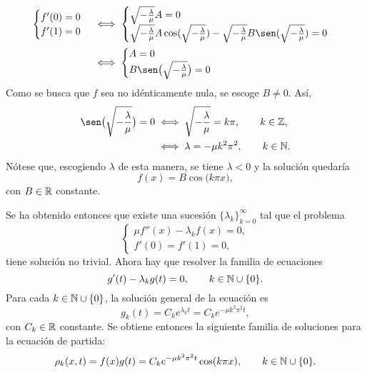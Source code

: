 \documentclass[11pt]{report}
\begin{document}
\begin{solution}
\begin{enumerate}
\begin{itemize}
            \begin{align*}
                \begin{cases}
                    f'(0)=0\\
                    f'(1)=0
                \end{cases} &\iff \begin{cases}
                    \sqrt{-\frac{\lambda}{\mu}}A = 0 \\
                    \sqrt{-\frac{\lambda}{\mu}} A \cos(\sqrt{-\frac{\lambda}{\mu}})-\sqrt{-\frac{\lambda}{\mu}}B\sen(\sqrt{-\frac{\lambda}{\mu}}) = 0
                \end{cases}
                \\
                &\iff \begin{cases}
                    A = 0 \\
                    B\sen\bigl(\sqrt{-\frac{\lambda}{\mu}}\bigr) = 0
                \end{cases}
            \end{align*}
            Como se busca que $f$ sea no idénticamente nula, se escoge $B \neq 0$. Así,
            \begin{align*}
                \sen\bigl(\sqrt{-\frac{\lambda}{\mu}}\bigr) = 0 &\iff \sqrt{-\frac{\lambda}{\mu}} = k\pi, \qquad k \in \Z, \\
                &\iff \lambda = -\mu k^2\pi^2, \qquad k \in \N.
            \end{align*}
            Nótese que, escogiendo $\lambda$ de esta manera, se tiene $\lambda < 0$ y la solución quedaría
            \[f(x) = B\cos\bigl(k\pi x\bigr),\]
            con $B \in \mathbb R$ constante.
        \end{itemize}
        Se ha obtenido entonces que existe una sucesión $\{\lambda_k\}_{k=0}^\infty$ tal que el problema 
        \[\begin{cases}
            \mu f''(x) - \lambda_k f(x) = 0, \\
            f'(0) = f'(1) = 0,
        \end{cases}\]
        tiene solución no trivial. Ahora hay que resolver la familia de ecuaciones
        \[g'(t) -\lambda_k g(t) = 0, \qquad k \in \mathbb N\cup\{0\}.\]
        Para cada $k \in \mathbb N\cup\{0\}$, la solución general de la ecuación es
        \[g_k(t) = C_ke^{\lambda_kt} = C_ke^{-\mu k^2\pi^2 t},\]
        con $C_k\in\mathbb R$ constante. Se obtiene entonces la siguiente familia de soluciones para la ecuación de partida:
        \[\rho_k(x,t) = f(x)g(t) =  C_ke^{-\mu k^2\pi^2 t}\cos(k\pi x), \qquad k \in \mathbb N\cup\{0\}.\]

\end{enumerate}
\end{solution}
\end{document}
